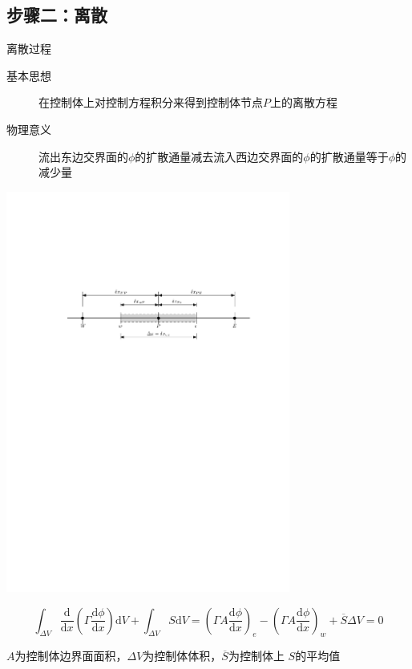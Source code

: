 \subsection{步骤二：离散}
\begin{frame}{离散过程}
 \begin{description}
   \item[基本思想] 在控制体上对控制方程积分来得到控制体节点$P$上的离散方程
   \item[物理意义] 流出东边交界面的$\phi$的扩散通量减去流入西边交界面的$\phi$的扩散通量等于$\phi$的减少量
 \end{description} 
\begin{center}
  \includegraphics[width=0.7\textwidth]{FVmGridNotation.pdf}
\end{center}
\begin{equation*}
  \int_{\Delta V}\!
  \frac{\mathrm{d} }{\mathrm{d} x}
  \left(
    \Gamma \frac{\mathrm{d} \phi}{\mathrm{d} x}
  \right)
  \mathrm{d}V
  +
  \int_{\Delta V}\!
  S
  \mathrm{d}V
  =
  \left(
    \Gamma A\frac{\mathrm{d} \phi}{\mathrm{d} x}
  \right)_{e}
  -
  \left(
    \Gamma A\frac{\mathrm{d} \phi}{\mathrm{d} x}
  \right)_{w}
  +
  \overline{S}\Delta V
  =
  0
  \label{EqFV_Diffusion_Discretisation}
\end{equation*}

$A$为控制体边界面面积，$\Delta V$为控制体体积，$\overline{S}$为控制体上
$S$的平均值
\end{frame}

